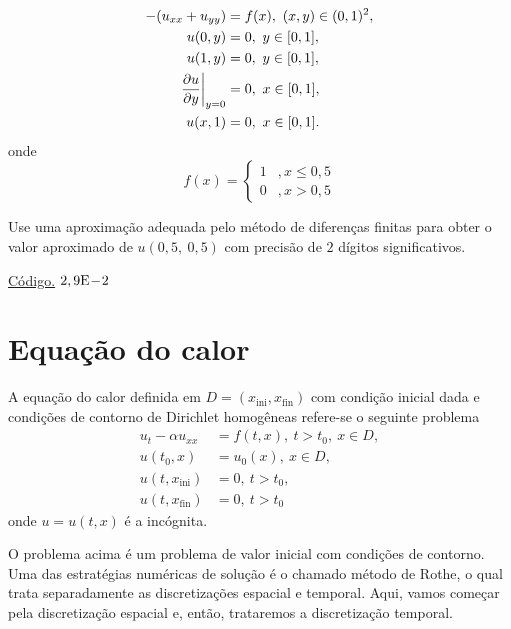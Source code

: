 \begin{exer}
  \begin{align}
    -(u_{xx} + u_{yy}) &= f(x),~(x, y)\in (0, 1)^2,\\
    u(0, y) &= 0,~y\in [0, 1],\\
    u(1, y) &= 0,~y\in [0, 1],\\
    \left.\frac{\partial u}{\partial y}\right|_{y=0} &= 0,~x\in [0, 1],\\
    u(x, 1) &= 0,~x\in [0, 1].
\end{align}
onde
\begin{equation}
  f(x) = \left\{
    \begin{array}{ll}
      1 &, x\leq 0,5\\
      0 &, x>0,5
    \end{array}
  \right.
\end{equation}
\end{exer}
Use uma aproximação adequada pelo método de diferenças finitas para obter o valor aproximado de $u(0,5,~0,5)$ com precisão de $2$ dígitos significativos.
\begin{resp}
  \ifisoctave 
  \href{https://github.com/phkonzen/notas/blob/master/src/MatematicaNumerica/cap_pvc/dados/exer_edp_Poisson_1/exer_edp_Possoin_1.m}{Código.} 
  \fi
  $2,9\mathrm{E}\!-\!2$
\end{resp}

\section{Equação do calor}\label{cap_edp_sec_calor}

A equação do calor definida em  $D = (x_{\text{ini}}, x_{\text{fin}})$ com condição inicial dada e condições de contorno de Dirichlet homogêneas refere-se o seguinte problema
\begin{align}
  u_t - \alpha u_{xx} &= f(t,x),~t>t_0,~x\in D, \label{eq:edp_calor_eq}\\
  u(t_0,x) &= u_0(x),~x\in D,\label{eq:edp_calor_ci}\\
  u(t, x_{\text{ini}}) &= 0,~t>t_0,\label{eq:edp_calor_bcxini}\\
  u(t, x_{\text{fin}}) &= 0,~t>t_0\label{eq:edp_calor_bcxfin}
\end{align}
onde $u = u(t,x)$ é a incógnita.

O problema acima é um problema de valor inicial com condições de contorno. Uma das estratégias numéricas de solução é o chamado método de Rothe, o qual trata separadamente as discretizações espacial e temporal. Aqui, vamos começar pela discretização espacial e, então, trataremos a discretização temporal.

